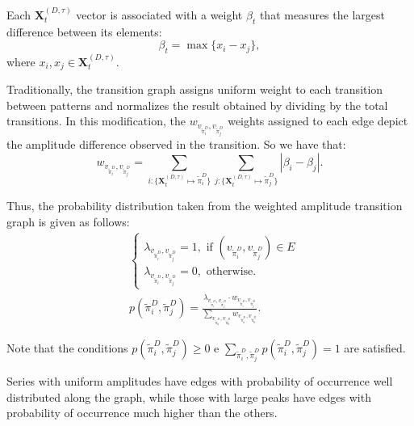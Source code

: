 \documentclass[paper=letter, fontsize=12pt]{article}
\begin{document}
Each $\mathbf{X}^{(D, \tau)}_t$ vector is associated with a weight $\beta_t$ that measures the largest difference between its elements:
\begin{equation}
\beta_t = \max\{x_i - x_j\},
\end{equation}
where $x_i, x_j \in \mathbf{X}^{(D, \tau)}_t$.

Traditionally, the transition graph assigns uniform weight to each transition between patterns and normalizes the result obtained by dividing by the total transitions.
In this modification, the $w_{v_{\widetilde\pi^D_i}, v_{\widetilde\pi^D_j}}$ weights assigned to each edge depict the amplitude difference observed in the transition.
So we have that:	
\begin{equation}
w_{v_{\widetilde \pi^D_i}, v_{\widetilde \pi^D_j}} =  \sum_{i : \{\mathbf{X}^{(D,\tau)}_t \mapsto \widetilde\pi^D_i\}} \sum_{j : \{\mathbf{X}^{(D,\tau)}_t \mapsto \widetilde\pi^D_j\}} |\beta_i - \beta_j| .
\end{equation}

Thus, the probability distribution taken from the weighted amplitude transition graph is given as follows:	
\begin{align}
&\left\{\begin{array}{l}
\lambda_{v_{\widetilde\pi^D_i}, v_{\widetilde\pi^D_j}} = 1, \text{ if } (v_{\widetilde\pi^D_i}, v_{\widetilde\pi^D_j}) \in {E} \\
\lambda_{v_{\widetilde\pi^D_i}, v_{\widetilde\pi^D_j}} = 0, \text{ otherwise}.
\end{array}\right. \\
%
&p(\widetilde\pi^D_i, \widetilde\pi^D_j) = \frac{\lambda_{v_{\widetilde\pi^D_i}, v_{\widetilde\pi^D_j}} \cdot w_{v_{\widetilde\pi^D_i}, v_{\widetilde\pi^D_j}}}{\sum_{v_{\widetilde\pi^D_a}, v_{\widetilde\pi^D_b}} w_{v_{\widetilde\pi^D_a}, v_{\widetilde\pi^D_b}}}.
\end{align}

Note that the conditions $p(\widetilde\pi^D_i, \widetilde\pi^D_j) \ge 0$ e $\sum_{\widetilde\pi^D_i, \widetilde\pi^D_j} p(\widetilde\pi^D_i, \widetilde\pi^D_j) = 1$ are satisfied.

Series with uniform amplitudes have edges with probability of occurrence well distributed along the graph, while those with large peaks have edges with probability of occurrence much higher than the others.
\end{document}
